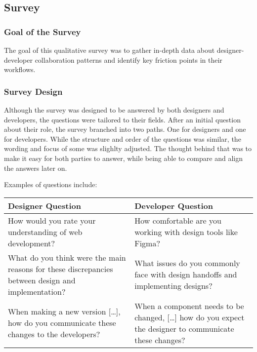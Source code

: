 \newpage
\subsection{Survey}

\subsubsection{Goal of the Survey}
The goal of this qualitative survey was to gather in-depth data about designer-developer
collaboration patterns and identify key friction points in their workflows.

\subsubsection{Survey Design}
Although the survey was designed to be answered by both designers and developers, the questions were
tailored to their fields. After an initial question about their role, the survey branched into two
paths. One for designers and one for developers. While the structure and order of the questions was
similar, the wording and focus of some was slighlty adjusted. The thought behind that was to make it
easy for both parties to answer, while being able to compare and align the answers later on.

Examples of questions include: %
\begin{center}
    \begin{tabular}{|m{7.5cm}|m{7.5cm}|}
        \hline
        \textbf{Designer Question}                                                                         & \textbf{Developer Question}                                                                                \\
        \hline
        How would you rate your understanding of web development?                                          & How comfortable are you working with design tools like Figma?                                              \\
        \hline
        What do you think were the main reasons for these discrepancies between design and implementation? & What issues do you commonly face with design handoffs and implementing designs?                            \\
        \hline
        When making a new version [\dots], how do you communicate these changes to the developers?         & When a component needs to be changed, [\dots] how do you expect the designer to communicate these changes? \\
        \hline
    \end{tabular}
\end{center}

